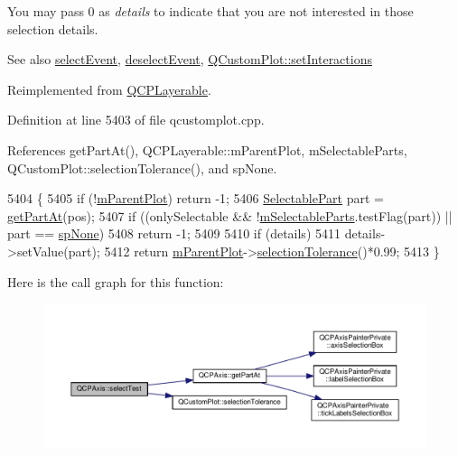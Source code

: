 You may pass 0 as {\itshape details} to indicate that you are not interested in those selection details.

\begin{DoxySeeAlso}{See also}
\hyperlink{class_q_c_p_axis_aa8a5fe80e2898ec08ada26b5fbee9eca}{select\+Event}, \hyperlink{class_q_c_p_axis_a53512242cde6ec21943a3ba10dbf78c3}{deselect\+Event}, \hyperlink{class_q_custom_plot_a5ee1e2f6ae27419deca53e75907c27e5}{Q\+Custom\+Plot\+::set\+Interactions} 
\end{DoxySeeAlso}


Reimplemented from \hyperlink{class_q_c_p_layerable_a4001c4d0dfec55598efa4d531f2179a9}{Q\+C\+P\+Layerable}.



Definition at line 5403 of file qcustomplot.\+cpp.



References get\+Part\+At(), Q\+C\+P\+Layerable\+::m\+Parent\+Plot, m\+Selectable\+Parts, Q\+Custom\+Plot\+::selection\+Tolerance(), and sp\+None.


\begin{DoxyCode}
5404 \{
5405   \textcolor{keywordflow}{if} (!\hyperlink{class_q_c_p_layerable_aa2a528433e44db02b8aef23c1f9f90ed}{mParentPlot}) \textcolor{keywordflow}{return} -1;
5406   \hyperlink{class_q_c_p_axis_abee4c7a54c468b1385dfce2c898b115f}{SelectablePart} part = \hyperlink{class_q_c_p_axis_ab2965a8ab1da948b897f1c006080760b}{getPartAt}(pos);
5407   \textcolor{keywordflow}{if} ((onlySelectable && !\hyperlink{class_q_c_p_axis_ab9042d8a095998f27a28b39411d8b9c3}{mSelectableParts}.testFlag(part)) || part == 
      \hyperlink{class_q_c_p_axis_abee4c7a54c468b1385dfce2c898b115fae0df8123a5528d5ccf87cb7794f971ea}{spNone})
5408     \textcolor{keywordflow}{return} -1;
5409   
5410   \textcolor{keywordflow}{if} (details)
5411     details->setValue(part);
5412   \textcolor{keywordflow}{return} \hyperlink{class_q_c_p_layerable_aa2a528433e44db02b8aef23c1f9f90ed}{mParentPlot}->\hyperlink{class_q_custom_plot_a7b738074c75e80070ef6a10263c6cd69}{selectionTolerance}()*0.99;
5413 \}
\end{DoxyCode}


Here is the call graph for this function\+:\nopagebreak
\begin{figure}[H]
\begin{center}
\leavevmode
\includegraphics[width=350pt]{class_q_c_p_axis_a2877a6230920c118be65c6113089f467_cgraph}
\end{center}
\end{figure}


